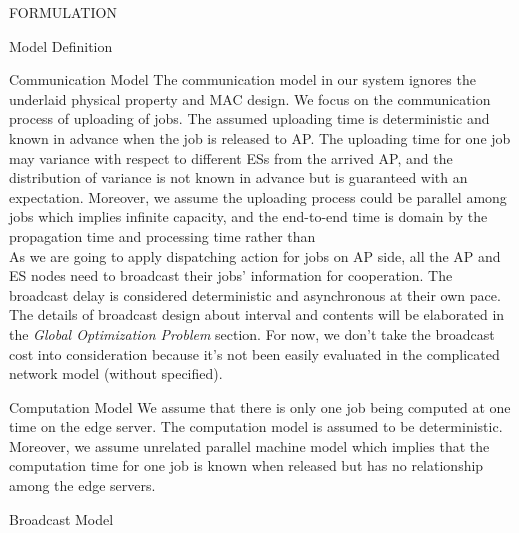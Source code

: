\documentclass[10pt, conference, letterpaper]{IEEEtran}
\begin{document}
\begin{section}{FORMULATION}
\begin{subsection}{Model Definition}
            \begin{subsubsection}{Communication Model}
                The communication model in our system ignores the underlaid physical property and MAC design. We focus on the communication process of uploading of jobs.
                The assumed uploading time is deterministic and known in advance when the job is released to AP. The uploading time for one job may variance with respect to different ESs from the arrived AP, and the distribution of variance is not known in advance but is guaranteed with an expectation.
                Moreover, we assume the uploading process could be parallel among jobs which implies infinite capacity, and the end-to-end time is domain by the propagation time and processing time rather than 
                \\
                As we are going to apply dispatching action for jobs on AP side, all the AP and ES nodes need to broadcast their jobs' information for cooperation. The broadcast delay is considered deterministic and asynchronous at their own pace.
                The details of broadcast design about interval and contents will be elaborated in the \textit{Global Optimization Problem} section.
                For now, we don't take the broadcast cost into consideration because it's not been easily evaluated in the complicated network model (without specified).
            \end{subsubsection}

            \begin{subsubsection}{Computation Model}
                We assume that there is only one job being computed at one time on the edge server. The computation model is assumed to be deterministic.
                Moreover, we assume unrelated parallel machine model which implies that the computation time for one job is known when released but has no relationship among the edge servers.
            \end{subsubsection}

            \begin{subsubsection}{Broadcast Model}


\end{subsubsection}
\end{subsection}
\end{section}
\end{document}
